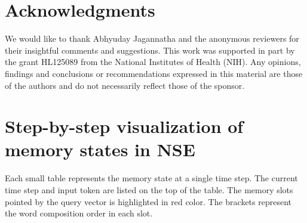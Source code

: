 \documentclass{article}
\begin{document}
\section*{Acknowledgments}

We would like to thank Abhyuday Jagannatha and the anonymous reviewers for
their insightful comments and suggestions.
This work was supported in part by the grant HL125089 from the National Institutes of Health (NIH). Any opinions, findings and conclusions or recommendations expressed in this material are those of the authors and do not necessarily 
reflect those of the sponsor.

\begingroup
	\small
	\setlength{\bibsep}{0pt plus 0.3ex}
	
	
\endgroup

\newpage

\appendix
\section{Step-by-step visualization of memory states in NSE}
\label{sup:mem}
Each small table represents the memory state at a single time step. The current time step and input token are listed on the top of the table. The memory slots pointed by the query vector is highlighted in red color. The brackets represent the word composition order in each slot.
\end{document}
